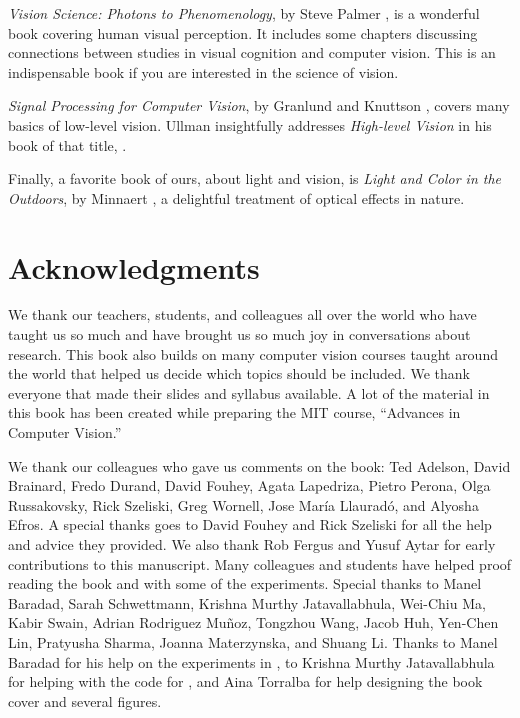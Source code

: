 \textit{Vision Science: Photons to Phenomenology}, by Steve
Palmer \cite{Palmer1999}, is a wonderful book covering
human visual perception. It includes some chapters discussing
connections between studies in visual cognition and computer
vision. This is an indispensable
book if you are interested in the science of vision.

\textit{Signal Processing for Computer Vision}, by Granlund and Knuttson \cite{Granlund95},
covers many basics of low-level vision.  Ullman insightfully addresses
\textit{High-level Vision} in his book of that title, \cite{Ullman2000}.

Finally, a favorite book of ours, about light and vision, is
\textit{Light and Color in the Outdoors}, by Minnaert \cite{Minnaert2012}, a delightful treatment
of optical effects in nature.

\section*{Acknowledgments}

We thank our teachers, students, and colleagues all over the world who have taught us so much and have brought us so much joy in conversations about research. This book also builds on many computer vision courses taught around the world that helped us decide which topics should be included. We thank everyone that made their slides and syllabus available. A lot of the material in this book has been created while preparing the MIT course, ``Advances in Computer Vision.''

We thank our colleagues who gave us comments on the book: Ted Adelson, David Brainard, Fredo Durand, David Fouhey, Agata Lapedriza, Pietro Perona, Olga Russakovsky, Rick Szeliski, Greg Wornell, Jose María Llauradó, and Alyosha Efros. A special thanks goes to David Fouhey and Rick Szeliski for all the help and advice they provided. We  also thank Rob Fergus and Yusuf Aytar for early contributions to this manuscript. Many colleagues and students have helped proof reading the book and with some of the experiments. Special thanks to Manel Baradad, Sarah Schwettmann, Krishna Murthy Jatavallabhula, Wei-Chiu Ma, Kabir Swain, Adrian Rodriguez Muñoz, Tongzhou Wang, Jacob Huh, Yen-Chen Lin, Pratyusha Sharma, Joanna Materzynska, and Shuang Li.
Thanks to Manel Baradad for his help on the experiments in \chap{\ref{chap:simple_system_revisited}},  to Krishna Murthy Jatavallabhula for helping with the code for \chap{\ref{chapter:3D_multiview}},
and Aina Torralba for help designing the book cover and several figures.

